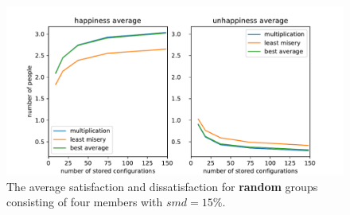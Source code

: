 \begin{figure}
    \centering
    \includegraphics[width=1\textwidth]{./figures/60_evaluation/random_happy_unhappy_total_group_amount-1000_smd-15.pdf}
    \caption{The average satisfaction and dissatisfaction for \textbf{random} groups consisting of four members with $smd=15\%$.}
    \label{fig:Evaluation:RandomGroupTotal}
\end{figure}
